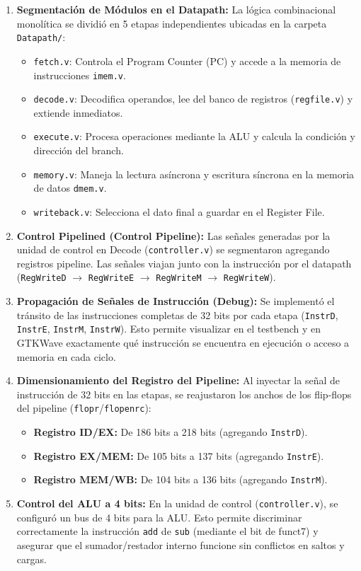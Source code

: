 \documentclass[12pt, a4paper]{article}
\begin{document}
\begin{enumerate}
  \item \textbf{Segmentación de Módulos en el Datapath:} La lógica combinacional monolítica se dividió en 5 etapas independientes ubicadas en la carpeta \texttt{Datapath/}:
  \begin{itemize}
    \item \texttt{fetch.v}: Controla el Program Counter (PC) y accede a la memoria de instrucciones \texttt{imem.v}.
    \item \texttt{decode.v}: Decodifica operandos, lee del banco de registros (\texttt{regfile.v}) y extiende inmediatos.
    \item \texttt{execute.v}: Procesa operaciones mediante la ALU y calcula la condición y dirección del branch.
    \item \texttt{memory.v}: Maneja la lectura asíncrona y escritura síncrona en la memoria de datos \texttt{dmem.v}.
    \item \texttt{writeback.v}: Selecciona el dato final a guardar en el Register File.
  \end{itemize}

  \item \textbf{Control Pipelined (Control Pipeline):} Las señales generadas por la unidad de control en Decode (\texttt{controller.v}) se segmentaron agregando registros pipeline. Las señales viajan junto con la instrucción por el datapath (\texttt{RegWriteD} $\rightarrow$ \texttt{RegWriteE} $\rightarrow$ \texttt{RegWriteM} $\rightarrow$ \texttt{RegWriteW}).

  \item \textbf{Propagación de Señales de Instrucción (Debug):} Se implementó el tránsito de las instrucciones completas de 32 bits por cada etapa (\texttt{InstrD}, \texttt{InstrE}, \texttt{InstrM}, \texttt{InstrW}). Esto permite visualizar en el testbench y en GTKWave exactamente qué instrucción se encuentra en ejecución o acceso a memoria en cada ciclo.

  \item \textbf{Dimensionamiento del Registro del Pipeline:} Al inyectar la señal de instrucción de 32 bits en las etapas, se reajustaron los anchos de los flip-flops del pipeline (\texttt{flopr}/\texttt{flopenrc}):
  \begin{itemize}
    \item \textbf{Registro ID/EX:} De 186 bits a 218 bits (agregando \texttt{InstrD}).
    \item \textbf{Registro EX/MEM:} De 105 bits a 137 bits (agregando \texttt{InstrE}).
    \item \textbf{Registro MEM/WB:} De 104 bits a 136 bits (agregando \texttt{InstrM}).
  \end{itemize}

  \item \textbf{Control del ALU a 4 bits:} En la unidad de control (\texttt{controller.v}), se configuró un bus de 4 bits para la ALU. Esto permite discriminar correctamente la instrucción \texttt{add} de \texttt{sub} (mediante el bit de funct7) y asegurar que el sumador/restador interno funcione sin conflictos en saltos y cargas.
\end{enumerate}
\end{document}
